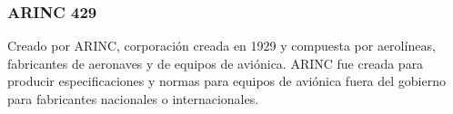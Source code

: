 
















\subsubsection{ARINC 429}
\label{sec:01.05.01.ARINC.429}

Creado por \ac{ARINC}, corporación creada en 1929 y compuesta por aerolíneas, fabricantes de aeronaves y de equipos de aviónica. \ac{ARINC} fue creada para producir especificaciones y normas para equipos de aviónica fuera del gobierno para fabricantes nacionales o internacionales.

